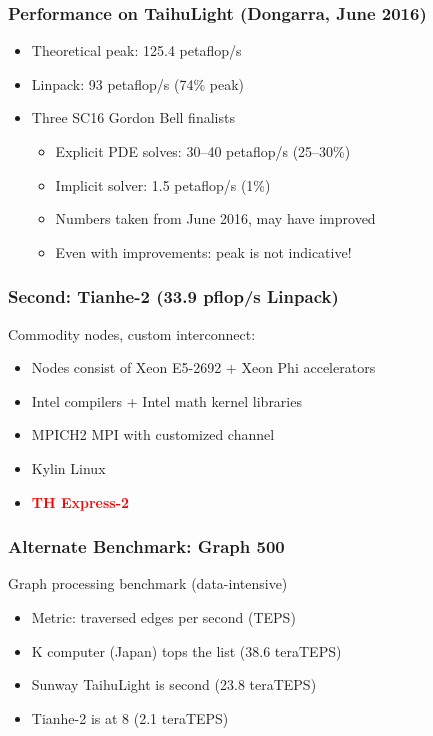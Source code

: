 \documentclass{beamer}
\begin{document}
\begin{frame}
  \frametitle{Performance on TaihuLight (Dongarra, June 2016)}

  \begin{itemize}
  \item Theoretical peak: 125.4 petaflop/s
  \item Linpack: 93 petaflop/s (74\% peak)
  \item Three SC16 Gordon Bell finalists
    \begin{itemize}
    \item Explicit PDE solves: 30--40 petaflop/s (25--30\%)
    \item Implicit solver: 1.5 petaflop/s (1\%)
    \item Numbers taken from June 2016, may have improved
    \item Even with improvements: peak is not indicative!
    \end{itemize}
  \end{itemize}
  
\end{frame}


\begin{frame}
  \frametitle{Second: Tianhe-2 (33.9 pflop/s Linpack)}

  Commodity nodes, custom interconnect:
  \begin{itemize}
  \item
    Nodes consist of Xeon E5-2692 + Xeon Phi accelerators
  \item
    Intel compilers + Intel math kernel libraries
  \item
    MPICH2 MPI with customized channel
  \item
    Kylin Linux
  \item
    \textcolor{red}{\bf TH Express-2}
  \end{itemize}
\end{frame}


\begin{frame}
  \frametitle{Alternate Benchmark: Graph 500}

  Graph processing benchmark (data-intensive)
  \begin{itemize}
  \item Metric: traversed edges per second (TEPS)
  \item K computer (Japan) tops the list (38.6 teraTEPS)
  \item Sunway TaihuLight is second (23.8 teraTEPS)
  \item Tianhe-2 is at 8 (2.1 teraTEPS)
  \end{itemize}
  
\end{frame}
\end{document}
